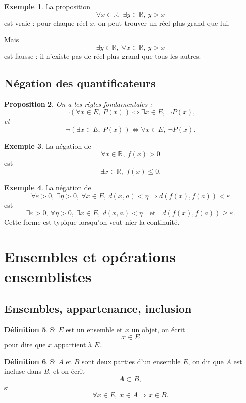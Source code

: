 \documentclass[11pt,a4paper]{article}
\theoremstyle{definition}
\newtheorem{definition}{Définition}[section]
\newtheorem{exemple}[definition]{Exemple}
\theoremstyle{plain}
\newtheorem{proposition}[definition]{Proposition}
\newcommand{\R}{\mathbb{R}}
\newcommand{\eps}{\varepsilon}
\begin{document}
\begin{exemple}
La proposition
\[
\forall x\in\R,\ \exists y\in\R,\ y>x
\]
est vraie : pour chaque réel $x$, on peut trouver un réel plus grand que lui.

Mais
\[
\exists y\in\R,\ \forall x\in\R,\ y>x
\]
est fausse : il n'existe pas de réel plus grand que tous les autres.
\end{exemple}

\subsection{Négation des quantificateurs}

\begin{proposition}
On a les règles fondamentales :
\[
\neg(\forall x\in E,\ P(x))
\Longleftrightarrow
\exists x\in E,\ \neg P(x),
\]
et
\[
\neg(\exists x\in E,\ P(x))
\Longleftrightarrow
\forall x\in E,\ \neg P(x).
\]
\end{proposition}

\begin{exemple}
La négation de
\[
\forall x\in\R,\ f(x)>0
\]
est
\[
\exists x\in\R,\ f(x)\leq 0.
\]
\end{exemple}

\begin{exemple}
La négation de
\[
\forall \eps>0,\ \exists \eta>0,\ \forall x\in E,\ d(x,a)<\eta \Rightarrow d(f(x),f(a))<\eps
\]
est
\[
\exists \eps>0,\ \forall \eta>0,\ \exists x\in E,\ d(x,a)<\eta
\quad \text{et}\quad
d(f(x),f(a))\geq \eps.
\]
Cette forme est typique lorsqu'on veut nier la continuité.
\end{exemple}

\section{Ensembles et opérations ensemblistes}

\subsection{Ensembles, appartenance, inclusion}

\begin{definition}
Si $E$ est un ensemble et $x$ un objet, on écrit
\[
x\in E
\]
pour dire que $x$ appartient à $E$.
\end{definition}

\begin{definition}
Si $A$ et $B$ sont deux parties d'un ensemble $E$, on dit que $A$ est incluse dans $B$, et on écrit
\[
A\subset B,
\]
si
\[
\forall x\in E,\ x\in A \Rightarrow x\in B.
\]
\end{definition}
\end{document}
